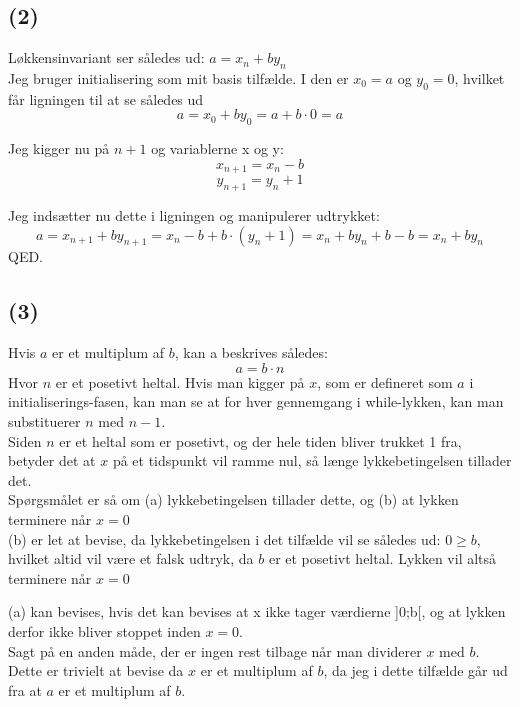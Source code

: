 \documentclass[12pt, a4paper, hidelinks]{article}
\begin{document}
\subsection{(2)}
Løkkensinvariant ser således ud: $a = x_n + b y_n$ \\
Jeg bruger initialisering som mit basis tilfælde. I den er $x_0 = a$ og $ y_0 = 0$, hvilket får ligningen til at se således ud
\begin{equation}
a = x_0 + b y_0 = a + b \cdot 0 = a
\end{equation}

Jeg kigger nu på $n+1$ og variablerne x og y:
\begin{equation}
x_{n+1} = x_n - b
\end{equation}
\begin{equation}
y_{n+1} = y_n + 1
\end{equation}

Jeg indsætter nu dette i ligningen og manipulerer udtrykket:
\begin{equation}
a = x_{n + 1} + b y_{n + 1} = x_n - b + b \cdot ( y_n + 1) = x_n + b y_n + b - b = x_n + b y_n  
\end{equation}
 QED.
\subsection{(3)}
Hvis $a$ er et multiplum af $b$, kan a beskrives således:
\begin{equation}
a = b \cdot n
\end{equation}
Hvor $n$ er et posetivt heltal. Hvis man kigger på $x$, som er defineret som $a$ i initialiserings-fasen, kan man se at for hver gennemgang i while-lykken, kan man substituerer $n$ med $ n - 1$. \\

Siden $n$ er et heltal som er posetivt, og der hele tiden bliver trukket 1 fra, betyder det at $x$ på et tidspunkt vil ramme nul, så længe lykkebetingelsen tillader det.\\
Spørgsmålet er så om (a) lykkebetingelsen tillader dette, og (b) at lykken terminere når $x = 0$ \\

(b) er let at bevise, da lykkebetingelsen i det tilfælde vil se således ud: $0 \geq b$, hvilket altid vil være et falsk udtryk, da $b$ er et posetivt heltal. Lykken vil altså terminere når $ x = 0$ 

(a) kan bevises, hvis det kan bevises at x ikke tager værdierne ]0;b[, og at lykken derfor ikke bliver stoppet inden $x = 0$. \\
Sagt på en anden måde, der er ingen rest tilbage når man dividerer $x$ med $b$. Dette er trivielt at bevise da $x$ er et multiplum af $b$, da jeg i dette tilfælde går ud fra at $a$ er et multiplum af $b$. \\
\end{document}
